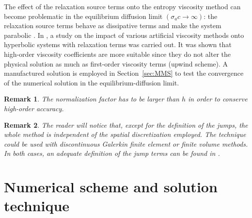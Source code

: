 \documentclass[review]{elsarticle}
\newtheorem{remark}{Remark}[section]
\newcommand{\sect}[1]{Section~\ref{#1}}                     %
\begin{document}
The effect of the relaxation source terms onto the entropy viscosity method can become problematic in the equilibrium diffusion limit $(\sigma_a c \to \infty)$: the relaxation source terms behave as dissipative terms and make the system parabolic \cite{Leveque}. In \cite{ShiJin}, a study on the impact of various artificial viscosity methods onto hyperbolic systems with relaxation terms was carried out. It was shown that high-order viscosity coefficients are more suitable since they do not alter the physical solution as much as first-order viscosity terms (upwind scheme). A manufactured  solution is employed in \sect{sec:MMS} to test the convergence of the numerical solution in the equilibrium-diffusion limit.  
\begin{remark}
The normalization factor has to be larger than $h$ in order to conserve high-order accuracy.
 \end{remark}

 \begin{remark}
The reader will notice that, except for the definition of the jumps, the whole method is independent of the spatial discretization employed. The technique could be used with discontinuous Galerkin finite element or finite volume methods. In both cases, an adequate  definition of the jump terms can be found in \cite{valentin}.
 \end{remark}
%
\section{Numerical scheme and solution technique}
\label{sec:num-scheme}
\end{document}
